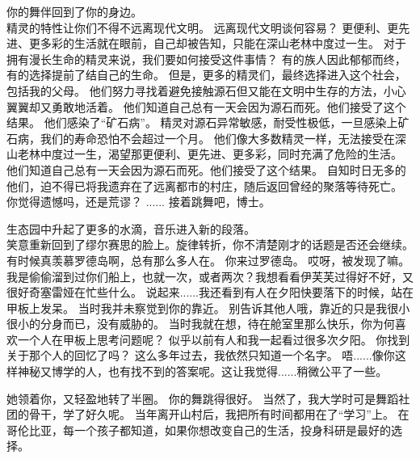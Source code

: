 \documentclass[openany]{book}
\begin{document}
\begin{dialogue}
    你的舞伴回到了你的身边。\\
     精灵的特性让你们不得不远离现代文明。
     远离现代文明谈何容易？
     更便利、更先进、更多彩的生活就在眼前，自己却被告知，只能在深山老林中度过一生。
     对于拥有漫长生命的精灵来说，我们要如何接受这件事情？
     有的族人因此郁郁而终，有的选择提前了结自己的生命。
     但是，更多的精灵们，最终选择进入这个社会，包括我的父母。
     他们努力寻找着避免接触源石但又能在文明中生存的方法，小心翼翼却又勇敢地活着。
     他们知道自己总有一天会因为源石而死。他们接受了这个结果。
     他们感染了“矿石病”。
     精灵对源石异常敏感，耐受性极低，一旦感染上矿石病，我们的寿命恐怕不会超过一个月。
     他们像大多数精灵一样，无法接受在深山老林中度过一生，渴望那更便利、更先进、更多彩，同时充满了危险的生活。
     他们知道自己总有一天会因为源石而死。他们接受了这个结果。
     自知时日无多的他们，迫不得已将我遗弃在了远离都市的村庄，随后返回曾经的聚落等待死亡。
     你觉得遗憾吗，还是荒谬？
     ......
     接着跳舞吧，博士。\par
    生态园中升起了更多的水滴，音乐进入新的段落。\\
    笑意重新回到了缪尔赛思的脸上。旋律转折，你不清楚刚才的话题是否还会继续。
     有时候真羡慕罗德岛啊，总有那么多人在。
     你来过罗德岛。
     哎呀，被发现了嘛。
     我是偷偷溜到过你们船上，也就一次，或者两次？我想看看伊芙芙过得好不好，又很好奇塞雷娅在忙些什么。
     说起来......我还看到有人在夕阳快要落下的时候，站在甲板上发呆。
     当时我并未察觉到你的靠近。
     别告诉其他人哦，靠近的只是我很小很小的分身而已，没有威胁的。
     当时我就在想，待在舱室里那么快乐，你为何喜欢一个人在甲板上思考问题呢？
     似乎以前有人和我一起看过很多次夕阳。
     你找到关于那个人的回忆了吗？
     这么多年过去，我依然只知道一个名字。
     唔......像你这样神秘又博学的人，也有找不到的答案呢。这让我觉得......稍微公平了一些。\par
    她领着你，又轻盈地转了半圈。
     你的舞跳得很好。
     当然了，我大学时可是舞蹈社团的骨干，学了好久呢。
     当年离开山村后，我把所有时间都用在了“学习”上。
     在哥伦比亚，每一个孩子都知道，如果你想改变自己的生活，投身科研是最好的选择。

\end{dialogue}
\end{document}
